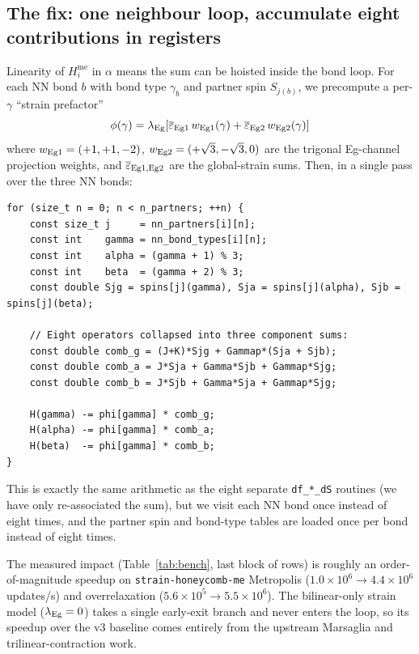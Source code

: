 \documentclass[11pt,letterpaper]{article}
\begin{document}
\subsection{The fix: one neighbour loop, accumulate eight contributions
            in registers}
Linearity of $H^{\text{me}}_i$ in $\alpha$ means the sum can be hoisted
inside the bond loop.  For each NN bond $b$ with bond type $\gamma_b$
and partner spin $S_{j(b)}$, we precompute a per-$\gamma$ ``strain
prefactor''
\[
   \phi(\gamma) = \lambda_{\rm Eg}\!\left[\overline{\varepsilon}_{\rm Eg1}\,
                  w_{\rm Eg1}(\gamma) + \overline{\varepsilon}_{\rm Eg2}\,
                  w_{\rm Eg2}(\gamma)\right]
\]
where $w_{\rm Eg1} = (+1,+1,-2)$, $w_{\rm Eg2} = (+\sqrt{3},-\sqrt{3},0)$
are the trigonal Eg-channel projection weights, and
$\overline{\varepsilon}_{\rm Eg1,Eg2}$ are the global-strain sums.
Then, in a single pass over the three NN bonds:
\begin{lstlisting}
for (size_t n = 0; n < n_partners; ++n) {
    const size_t j     = nn_partners[i][n];
    const int    gamma = nn_bond_types[i][n];
    const int    alpha = (gamma + 1) % 3;
    const int    beta  = (gamma + 2) % 3;
    const double Sjg = spins[j](gamma), Sja = spins[j](alpha), Sjb = spins[j](beta);

    // Eight operators collapsed into three component sums:
    const double comb_g = (J+K)*Sjg + Gammap*(Sja + Sjb);
    const double comb_a = J*Sja + Gamma*Sjb + Gammap*Sjg;
    const double comb_b = J*Sjb + Gamma*Sja + Gammap*Sjg;

    H(gamma) -= phi[gamma] * comb_g;
    H(alpha) -= phi[gamma] * comb_a;
    H(beta)  -= phi[gamma] * comb_b;
}
\end{lstlisting}
This is exactly the same arithmetic as the eight separate
\texttt{df\_*\_dS} routines (we have only re-associated the sum), but
we visit each NN bond once instead of eight times, and the partner
spin and bond-type tables are loaded once per bond instead of eight
times.

The measured impact (Table~\ref{tab:bench}, last block of rows) is
roughly an order-of-magnitude speedup on
\texttt{strain-honeycomb-me} Metropolis ($1.0 \times 10^{6}\to
4.4 \times 10^{6}$ updates/s) and overrelaxation ($5.6 \times
10^{5}\to 5.5 \times 10^{6}$).  The bilinear-only strain model
($\lambda_{\rm Eg} = 0$) takes a single early-exit branch and never
enters the loop, so its speedup over the v3 baseline comes entirely
from the upstream Marsaglia and trilinear-contraction work.
\end{document}
